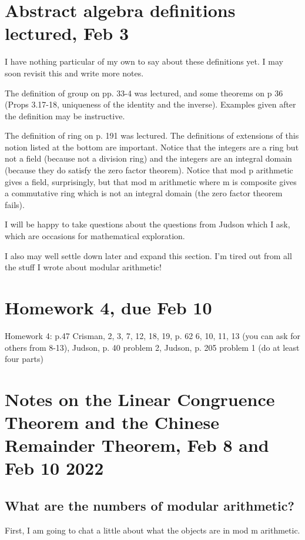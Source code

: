 \documentclass[12pt]{article}
\begin{document}
\newpage


\section{Abstract algebra definitions lectured, Feb 3}

I have nothing particular of my own to say about these definitions yet.  I may soon revisit this and write more notes.

The definition of group on pp. 33-4 was lectured, and some theorems on p 36 (Props 3.17-18, uniqueness of the identity and the inverse).  Examples given after the definition may be instructive.

The definition of ring on p. 191 was lectured.  The definitions of extensions of this notion listed at the bottom are important.  Notice that
the integers are a ring but not a field (because not a division ring) and the integers are an integral domain (because they do satisfy the zero factor theorem).
Notice that mod p arithmetic gives a field, surprisingly, but that mod m arithmetic where m is composite gives a commutative ring which is not an integral domain (the zero factor theorem fails).

I will be happy to take questions about the questions from Judson which I ask, which are occasions for mathematical exploration.

I also may well settle down later and expand this section.  I'm tired out from all the stuff I wrote about modular arithmetic!

\section{Homework 4, due Feb 10}

Homework 4:  p.47 Crisman, 2, 3, 7, 12, 18, 19, p. 62 6, 10, 11, 13 (you can ask for others from 8-13), Judson, p. 40 problem 2, Judson, p. 205 problem 1 (do at least four parts)

\section{Notes on the Linear Congruence Theorem and the Chinese Remainder Theorem, Feb 8 and Feb 10 2022}

\subsection{What are the numbers of modular arithmetic?}

First, I am going to chat a little about what the objects are in mod m arithmetic.
\end{document}
